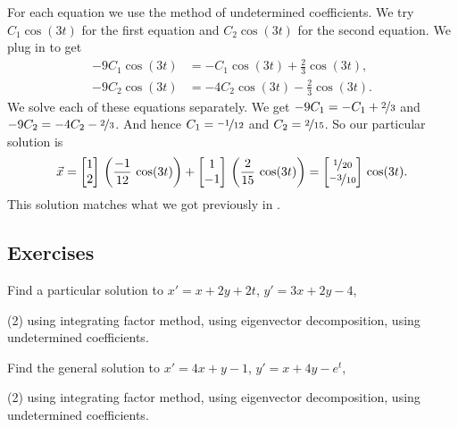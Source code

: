 \begin{example}
\begin{equation*}
\end{equation*}
For each equation we use the method of undetermined coefficients.
We 
try $C_1 \cos (3t)$ for the first equation and $C_2 \cos (3t)$ for the second
equation.  We plug in to get
\begin{align*}
- 9 C_1 \cos (3t) & = - C_1 \cos (3t) + \frac{2}{3} \cos (3t) , \\
- 9 C_2 \cos (3t) & = - 4 C_2 \cos (3t) - \frac{2}{3} \cos (3t) .
\end{align*}
We solve 
each of these equations separately.  We get
$- 9 C_1 = - C_1 + \nicefrac{2}{3}$ and
$- 9 C_2 = - 4C_2 - \nicefrac{2}{3}$.  And hence $C_1 = \nicefrac{-1}{12}$
and $C_2 = \nicefrac{2}{15}$.
So our particular solution is
\begin{equation*}
\vec{x} =
\begin{bmatrix} 1 \\
2 \end{bmatrix} \,
\left( \frac{-1}{12} \, \cos (3t) \right)
+
\begin{bmatrix} 1 \\
-1 \end{bmatrix} \,
\left( \frac{2}{15} \, \cos (3t) \right)
=
\begin{bmatrix} \nicefrac{1}{20} \\
\nicefrac{-3}{10} \end{bmatrix} \,
\cos (3t) .
\end{equation*}
This solution matches what we got previously in .
\end{example}

\subsection{Exercises}

\begin{exercise}
Find a particular solution to
$x' = x+ 2y +2t$, 
$y' = 3x + 2y -4$,
\begin{tasks}(2)
\task using integrating factor method,
\task using eigenvector decomposition,
\task using undetermined coefficients.
\end{tasks}
\end{exercise}

\begin{exercise}
Find the general solution to
$x' = 4x+ y -1$, 
$y' = x + 4y -e^t$,
\begin{tasks}(2)
\task using integrating factor method,
\task using eigenvector decomposition,
\task using undetermined coefficients.
\end{tasks}
\end{exercise}

